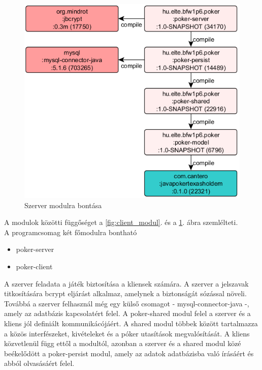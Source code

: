 \begin{figure}[h!]
	\caption{Szerver modulra bontása}
	\label{fig:server_modul}
	\centering
	\includegraphics{user-documentation/images/poker-server-deps.png}
\end{figure}
A modulok közötti függőséget a \ref{fig:client_modul}. és a \ref{fig:server_modul}. ábra szemlélteti. \\
A programcsomag két főmodulra bontható
\begin{itemize}[leftmargin=2.7cm]
\item poker-server
\item poker-client
\end{itemize}
A szerver feladata a játék biztosítása a kliensek számára.
A szerver a jelszavak titkosítására bcrypt eljárást alkalmaz, amelynek a biztonságát sózással növeli. Továbbá a szerver felhasznál még egy külső csomagot - mysql-connector-java -, amely az adatbázis kapcsolatért felel.
A poker-shared modul felel a szerver és a kliens jól definiált kommunikácójáért. A shared modul többek között tartalmazza a közös interfészeket, kivételeket és a póker utasítások megvalósítását. A kliens közvetlenül függ ettől a modultól, azonban a szerver és a shared modul közé beékelődött a poker-persist modul, amely az adatok adatbázisba való írásáért és abból olvasásáért felel.

